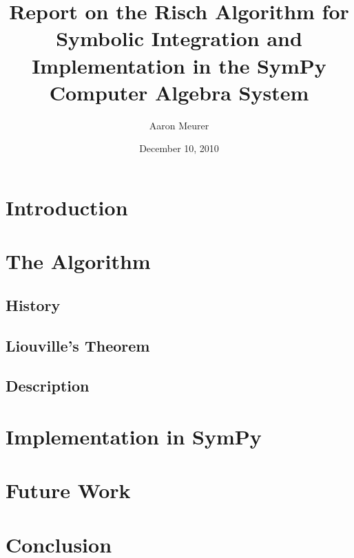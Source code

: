 \documentclass[12pt,titlepage]{article}
\begin{document}


\title{Report on the Risch Algorithm for Symbolic
Integration and Implementation in the SymPy Computer Algebra System}
\author{Aaron Meurer}
\date{December 10, 2010}
\maketitle
%
\begin{abstract}

\end{abstract}

\tableofcontents

\section{Introduction}
\label{introduction}


\section{The Algorithm}
\subsection{History}
\label{history}


\subsection{Liouville's Theorem}
\label{liouville}


\subsection{Description}
\label{description}


\section{Implementation in SymPy}
\label{implementation}


\section{Future Work}
\label{future}


\section{Conclusion}
\label{conclusion}

\end{document}
